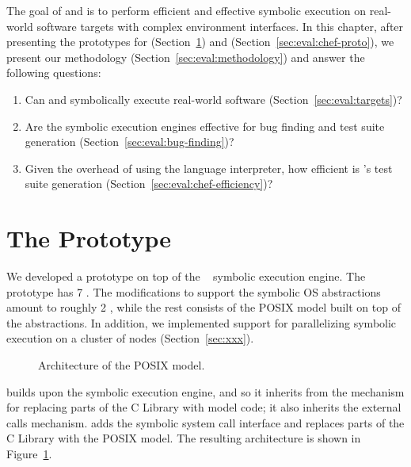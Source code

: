 The goal of \chef and \cnine is to perform efficient and effective symbolic execution on real-world software targets with complex environment interfaces.
%
In this chapter, after presenting the prototypes for \cnine (Section~\ref{sec:eval:cnine-proto}) and \chef (Section~\ref{sec:eval:chef-proto}), we present our methodology (Section~\ref{sec:eval:methodology}) and answer the following questions:
\begin{enumerate}
\item Can \chef and \cnine symbolically execute real-world software (Section~\ref{sec:eval:targets})?
\item Are the symbolic execution engines effective for bug finding and test suite generation (Section~\ref{sec:eval:bug-finding})?
\item Given the overhead of using the language interpreter, how efficient is \chef's test suite generation (Section~\ref{sec:eval:chef-efficiency})?
\end{enumerate}

\section{The \cnine Prototype}
\label{sec:eval:cnine-proto}

We developed a \cnine prototype on top of the \klee~\cite{klee} symbolic execution engine.  The prototype has 7 \kloc.
%
The \klee modifications to support the symbolic OS abstractions amount to roughly 2 \kloc, while the rest consists of the POSIX model built on top of the abstractions.
%
In addition, we implemented support for parallelizing symbolic execution on a cluster of nodes (Section~\ref{sec:xxx}).

\begin{figure}[h!]
  \centering
  \caption{Architecture of the \cnine POSIX model.}
  \label{fig:cloud9:posixmodel}
\end{figure}

\cnine builds upon the \klee symbolic execution engine, and so it inherits from \klee the mechanism for replacing parts of the C Library with model code; it also inherits the external calls mechanism.  \cnine adds the symbolic system call interface and replaces parts of the C Library with the POSIX model.  The resulting architecture is shown in Figure~\ref{fig:cloud9:posixmodel}.

\newcommand{\cI}{\!{\raisebox{-0.2ex}{\large\ding{192}}}\xspace}
\newcommand{\cII}{\!{\raisebox{-0.2ex}{\large\ding{193}}}\xspace}
\newcommand{\cIII}{\!{\raisebox{-0.2ex}{\large\ding{194}}}\xspace}
\newcommand{\cIV}{\!{\raisebox{-0.2ex}{\large\ding{195}}}\xspace}
\newcommand{\cV}{\!{\raisebox{-0.2ex}{\large\ding{196}}}\xspace}
\newcommand{\cVI}{\!{\raisebox{-0.2ex}{\large\ding{197}}}\xspace}
\newcommand{\cVII}{\!{\raisebox{-0.2ex}{\large\ding{198}}}\xspace}
\newcommand{\cVIII}{\!{\raisebox{-0.2ex}{\large\ding{199}}}\xspace}

